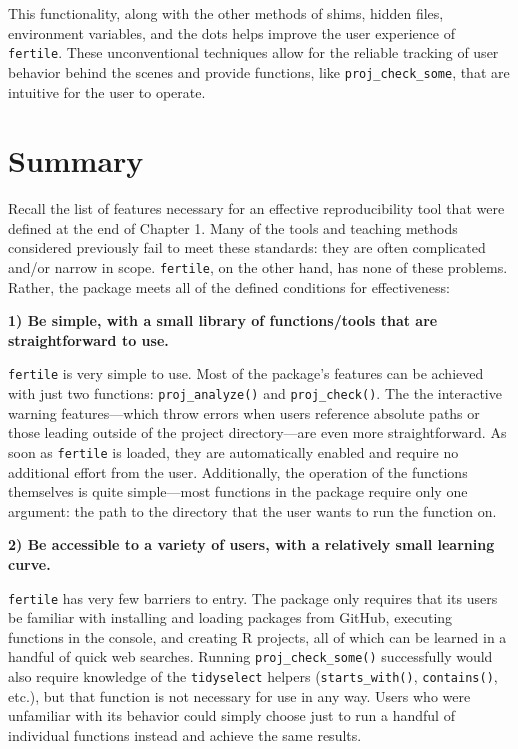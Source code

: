\documentclass[12pt,twoside]{reedthesis}
\begin{document}
This functionality, along with the other methods of shims, hidden files, environment variables, and the dots helps improve the user experience of \texttt{fertile}. These unconventional techniques allow for the reliable tracking of user behavior behind the scenes and provide functions, like \texttt{proj\_check\_some}, that are intuitive for the user to operate.

\hypertarget{summary}{%
\section{Summary}\label{summary}}

Recall the list of features necessary for an effective reproducibility tool that were defined at the end of Chapter 1. Many of the tools and teaching methods considered previously fail to meet these standards: they are often complicated and/or narrow in scope. \texttt{fertile}, on the other hand, has none of these problems. Rather, the package meets all of the defined conditions for effectiveness:

\textbf{1) Be simple, with a small library of functions/tools that are straightforward to use.}

\texttt{fertile} is very simple to use. Most of the package's features can be achieved with just two functions: \texttt{proj\_analyze()} and \texttt{proj\_check()}. The the interactive warning features---which throw errors when users reference absolute paths or those leading outside of the project directory---are even more straightforward. As soon as \texttt{fertile} is loaded, they are automatically enabled and require no additional effort from the user. Additionally, the operation of the functions themselves is quite simple---most functions in the package require only one argument: the path to the directory that the user wants to run the function on.

\textbf{2) Be accessible to a variety of users, with a relatively small learning curve.}

\texttt{fertile} has very few barriers to entry. The package only requires that its users be familiar with installing and loading packages from GitHub, executing functions in the console, and creating R projects, all of which can be learned in a handful of quick web searches. Running \texttt{proj\_check\_some()} successfully would also require knowledge of the \texttt{tidyselect} helpers (\texttt{starts\_with()}, \texttt{contains()}, etc.), but that function is not necessary for use in any way. Users who were unfamiliar with its behavior could simply choose just to run a handful of individual functions instead and achieve the same results.
\end{document}
